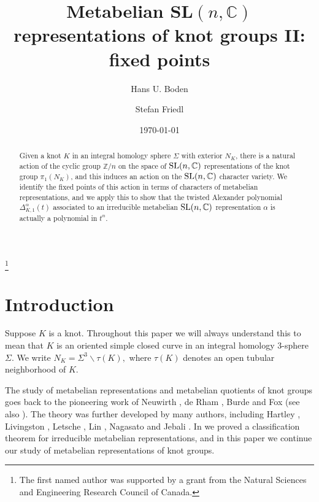 \documentclass[12pt]{amsart}
\theoremstyle{plain}
\theoremstyle{remark}
\begin{document}
\title[Metabelian SL$(n,{{\mathbb C}})$ representations of knot groups II]{Metabelian SL$(n,{{\mathbb C}})$ representations of knot groups II:  fixed points}

\author{Hans U. Boden}
\address{Department of Mathematics, McMaster University,
Hamilton, Ontario} 
\thanks{The first named author was supported by a grant from the Natural Sciences and Engineering Research Council of Canada.}

\author{Stefan Friedl}
\address{
University of Warwick, Coventry, UK}


\date{\today}
\begin{abstract}
Given a knot $K$ in an integral homology sphere ${\Sigma}$ with exterior $N_K$,
there is a natural action of the cyclic group ${{\mathbb Z}}/n$ on the space of ${{\rm SL}}(n,{{\mathbb C}})$ representations
of the knot group $\pi_1(N_K)$, and this induces an action on the ${{\rm SL}}(n,{{\mathbb C}})$ character variety.
We identify the fixed points of this action in terms of characters of metabelian representations,
and we apply this to show that the twisted Alexander polynomial $\Delta^{\alpha}_{K,1}(t)$
associated to an irreducible metabelian ${{\rm SL}}(n,{{\mathbb C}})$
representation ${\alpha}$ is actually a polynomial in $t^n$.

 \end{abstract}
\maketitle

\section{Introduction}

Suppose $K$ is a knot. Throughout this paper we will always understand this to mean that $K$ is  an oriented simple closed curve in an integral homology 3-sphere ${\Sigma}$.
We write $N_K={\Sigma}^3\smallsetminus \tau(K),$ where $\tau(K)$ denotes an open tubular neighborhood of $K$.

The study of metabelian representations and metabelian quotients of knot groups goes back to the pioneering work of
Neuwirth \cite{Ne65},  de Rham \cite{dRh68}, Burde \cite{Bu67}  and Fox \cite{Fo70}
(see also \cite[Section~14]{BZ03}).
The theory was further developed
by many authors, including Hartley \cite{Ha79,Ha83},  Livingston \cite{Li95}, Letsche \cite{Le00}, Lin \cite{Lin01}, Nagasato
\cite{Na07} and  Jebali \cite{Je08}.
In \cite{BF08} we proved a classification theorem for irreducible metabelian representations,
and in this paper we continue  our study of metabelian representations of knot groups.
\end{document}
